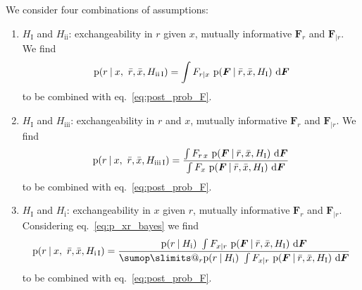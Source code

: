 \documentclass[\ifafour a4paper,12pt,\else a5paper,10pt,\fi%
onecolumn,oneside,article,%
british%
]{memoir}
\makeatletter
\theoremstyle{remark}
\theoremstyle{innote}
\def\sum{\DOTSI\sumop\slimits@}
\def\prod{\DOTSI\prodop\slimits@}
\newcommand*{\di}{\mathrm{d}}%
\newcommand*{\p}{\mathrm{p}}%
\renewcommand*{\|}[1][]{\nonscript\:#1\vert\nonscript\:\mathopen{}}
\renewcommand*{\=}{\TextOrMath\texteq\eq}
\newcommand*{\eqn}{eq.}%
\newcommand*{\eqns}{eqs}%
\newcommand*{\q}{}%
\DeclareRobustCommand*{\q}{%
  \mathord{\mathpalette\bigcdot@{}}%
}
\newcommand*{\bigcdot@scalefactor}{0.7}
\newcommand*{\bigcdot@widthfactor}{1.5}
\newcommand*{\bigcdot@}[2]{%
  \sbox0{$#1\vcenter{}$}%
  \sbox2{$#1\cdot\m@th$}%
  \hbox to \bigcdot@widthfactor\wd2{%
    \hfil
    \raise\ht0\hbox{%
      \scalebox{\bigcdot@scalefactor}{%
        \lower\ht0\hbox{$#1\bullet\m@th$}%
      }%
    }%
    \hfil
  }%
}
\newcommand*{\ro}{r}
\newcommand*{\xo}{x}
\newcommand*{\rd}{\bar{r}}
\newcommand*{\xd}{\bar{x}}
\newcommand*{\yF}{\bm{F}}
\newcommand*{\yFr}{\yF_{\bm{\mid}r}}
\makeatother
\begin{document}
We consider four combinations of assumptions:
\begin{enumerate}[label=\arabic*.]
\item\label{item:I_ii} $H_{\textrm{I}}$ and $H_{\textrm{ii}}$:
  exchangeability in $r$ given $x$, mutually informative $\yF_{r\q}$ and
  $\yFr$.
  We find
  \begin{equation}
    \label{eq:post_rx_simple}
    \p(\ro \| \xo,\ \rd,\xd, H_{\textrm{ii\,I}})
=  \int F_{\ro\mid\xo}\ \p(\yF\| \rd,\xd, H_{\textrm{I}})\ \di\yF
\end{equation}
to be combined with \eqn~\eqref{eq:post_prob_F}.

\item\label{item:I_iii} $H_{\textrm{I}}$ and $H_{\textrm{iii}}$:
  exchangeability in $r$ and $x$, mutually informative $\yF_{r\q}$ and
  $\yFr$. %
  We find
  \begin{equation}
    \label{eq:post_rx_updated}
        \p(\ro \| \xo,\ \rd,\xd, H_{\textrm{iii\,I}})
        =
        \frac{\int F_{\ro\,\xo}\ \p(\yF\| \rd,\xd, H_{\textrm{I}})\
          \di\yF}{
          \int F_{\q\xo}\ \p(\yF\| \rd,\xd, H_{\textrm{I}})\
          \di\yF
        }
  \end{equation}
  to be combined with \eqn~\eqref{eq:post_prob_F}.

\item\label{item:I_i} $H_{\textrm{I}}$ and $H_{\textrm{i}}$:
  exchangeability in $x$ given $r$, mutually informative $\yF_{r\q}$ and
  $\yFr$. Considering \eqn~\eqref{eq:p_xr_bayes} we find
  \begin{equation}
    \label{eq:post_xr_unfactorized}
    \p(\ro \| \xo,\ \rd,\xd, H_{\textrm{i\,I}}) = \frac{
    \p(\ro\|  H_{\textrm{i}})\ \int F_{\xo\mid\ro}\ \p(\yF\| \rd,\xd,
    H_{\textrm{I}})\ \di\yF
  }{
    \sum_{r}\p(r\|  H_{\textrm{i}})\ \int F_{\xo\mid r}\ \p(\yF\| \rd,\xd,
    H_{\textrm{I}})\ \di\yF
    }
\end{equation}
to be combined with \eqn~\eqref{eq:post_prob_F}.


\end{enumerate}
\end{document}

